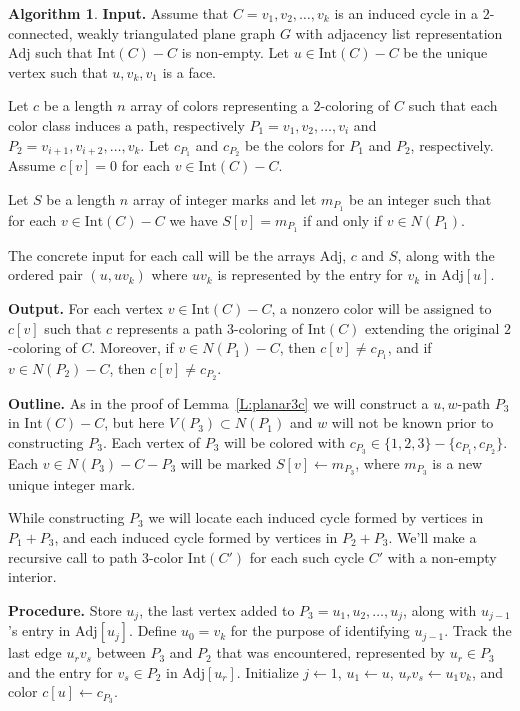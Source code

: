 \documentclass[12pt,letterpaper]{article}
\theoremstyle{plain}
\theoremstyle{definition}
\theoremstyle{break}
\newtheorem{algorithm}[lemma]{Algorithm}     %
\begin{document}
\begin{algorithm}\label{A:poh_linear}
\textbf{Input.} Assume that $C=v_1,v_2,\ldots,v_k$ is an induced cycle
in a $2$-connected, weakly triangulated plane
graph $G$ with adjacency list representation $\text{Adj}$ such
that $\text{Int}(C)-C$ is non-empty.
Let $u\in\text{Int}(C)-C$ be the unique vertex such that $u,v_k,v_1$ is a face.

Let $c$ be a length $n$ array of colors
representing a $2$-coloring of $C$ such
that each color class induces a path, respectively $P_1=v_1,v_2,\ldots,v_i$ and
$P_2=v_{i+1},v_{i+2},\ldots,v_k$. Let $c_{P_1}$ and $c_{P_2}$ be the colors
for $P_1$ and $P_2$, respectively. Assume $c[v]=0$ for each
$v\in\text{Int}(C)-C$.

Let $S$ be a length $n$ array of integer marks and let $m_{P_1}$ be an integer
such that for each $v\in\text{Int}(C)-C$ we have $S[v]=m_{P_1}$ if and only if
$v\in N(P_1)$.

The concrete input for each call will be the arrays $\text{Adj}$, $c$ and $S$,
along with the ordered pair $(u, uv_k)$ where $uv_k$ is represented by the
entry for $v_k$ in $\text{Adj}[u]$.

\textbf{Output.} For each vertex $v\in\text{Int}(C)-C$, a nonzero color will be
assigned to $c[v]$ such that $c$ represents a path $3$-coloring of
$\text{Int}(C)$ extending the original $2$-coloring of $C$. Moreover, if
$v\in N(P_1)-C$, then $c[v]\ne c_{P_1}$, and if $v\in N(P_2)-C$, then
$c[v]\ne c_{P_2}$.

\textbf{Outline.} As in the proof of Lemma~\ref{L:planar3c} we will
construct a $u,w$-path $P_3$
in $\text{Int}(C)-C$, but here $V(P_3)\subset N(P_1)$ and $w$
will not be known prior to constructing $P_3$.
Each vertex of $P_3$ will be colored with
$c_{P_3}\in\{1,2,3\}-\{c_{P_1},c_{P_2}\}$. Each $v\in
N(P_3)-C-P_3$ will be marked $S[v]\leftarrow m_{P_3}$, where $m_{P_3}$
is a new unique integer mark.

While constructing $P_3$ we will locate each induced cycle formed by
vertices in $P_1+P_3$, and each induced cycle formed by
vertices in $P_2+P_3$. We'll make a recursive call to path $3$-color
$\text{Int}(C')$ for
each such cycle $C'$ with a non-empty interior.

\textbf{Procedure.}
Store $u_j$, the last
vertex added to $P_3=u_1,u_2,\ldots,u_j$, along with
$u_{j-1}$'s entry in $\text{Adj}[u_j]$. Define $u_0=v_k$ for the purpose
of identifying $u_{j-1}$. Track the
last edge $u_rv_s$ between $P_3$ and $P_2$ that was encountered,
represented by
$u_r\in P_3$ and the entry for $v_s\in P_2$ in $\text{Adj}[u_r]$.
Initialize $j\leftarrow 1$, $u_1\leftarrow u$, $u_rv_s\leftarrow u_1v_k$,
and color $c[u]\leftarrow c_{P_3}$. 


\end{algorithm}
\end{document}
